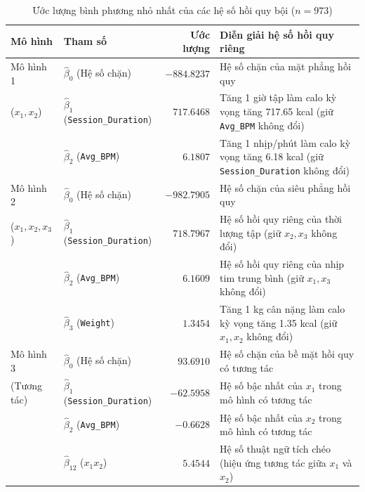 \documentclass[12pt,a4paper]{report}
\begin{document}
\begin{table}[htbp]
\centering\footnotesize
\caption{Ước lượng bình phương nhỏ nhất của các hệ số hồi quy bội ($n = 973$)}
\begin{tabularx}{\textwidth}{ll r X}
\toprule
\textbf{Mô hình} & \textbf{Tham số} & \textbf{Ước lượng} & \textbf{Diễn giải hệ số hồi quy riêng} \\
\midrule
Mô hình 1 & $\hat{\beta}_0$ (Hệ số chặn) & $-884.8237$ & Hệ số chặn của mặt phẳng hồi quy \\
($x_1, x_2$) & $\hat{\beta}_1$ (\texttt{Session\_Duration}) & $717.6468$ & Tăng 1 giờ tập làm calo kỳ vọng tăng 717.65 kcal (giữ \texttt{Avg\_BPM} không đổi) \\
 & $\hat{\beta}_2$ (\texttt{Avg\_BPM}) & $6.1807$ & Tăng 1 nhịp/phút làm calo kỳ vọng tăng 6.18 kcal (giữ \texttt{Session\_Duration} không đổi) \\
\midrule
Mô hình 2 & $\hat{\beta}_0$ (Hệ số chặn) & $-982.7905$ & Hệ số chặn của siêu phẳng hồi quy \\
($x_1, x_2, x_3$) & $\hat{\beta}_1$ (\texttt{Session\_Duration}) & $718.7967$ & Hệ số hồi quy riêng của thời lượng tập (giữ $x_2, x_3$ không đổi) \\
 & $\hat{\beta}_2$ (\texttt{Avg\_BPM}) & $6.1609$ & Hệ số hồi quy riêng của nhịp tim trung bình (giữ $x_1, x_3$ không đổi) \\
 & $\hat{\beta}_3$ (\texttt{Weight}) & $1.3454$ & Tăng 1 kg cân nặng làm calo kỳ vọng tăng 1.35 kcal (giữ $x_1, x_2$ không đổi) \\
\midrule
Mô hình 3 & $\hat{\beta}_0$ (Hệ số chặn) & $93.6910$ & Hệ số chặn của bề mặt hồi quy có tương tác \\
(Tương tác) & $\hat{\beta}_1$ (\texttt{Session\_Duration}) & $-62.5958$ & Hệ số bậc nhất của $x_1$ trong mô hình có tương tác \\
 & $\hat{\beta}_2$ (\texttt{Avg\_BPM}) & $-0.6628$ & Hệ số bậc nhất của $x_2$ trong mô hình có tương tác \\
 & $\hat{\beta}_{12}$ ($x_1 x_2$) & $5.4544$ & Hệ số thuật ngữ tích chéo (hiệu ứng tương tác giữa $x_1$ và $x_2$) \\
\bottomrule
\end{tabularx}
\end{table}
\end{document}

